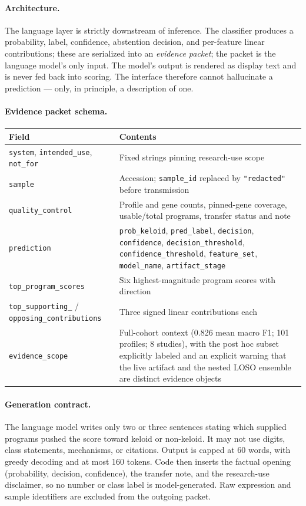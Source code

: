 \paragraph{Architecture.} The language layer is strictly downstream of
inference. The classifier produces a probability, label, confidence, abstention
decision, and per-feature linear contributions; these are serialized into an
\emph{evidence packet}; the packet is the language model's only input. The
model's output is rendered as display text and is never fed back into scoring.
The interface therefore cannot hallucinate a prediction --- only, in principle,
a description of one.

\paragraph{Evidence packet schema.}

{\small
\begin{tabular}{@{}lp{8.6cm}@{}}
\toprule
Field & Contents \\
\midrule
\texttt{system}, \texttt{intended\_use}, \texttt{not\_for} & Fixed strings pinning research-use scope \\
\texttt{sample} & Accession; \texttt{sample\_id} replaced by \texttt{"redacted"} before transmission \\
\texttt{quality\_control} & Profile and gene counts, pinned-gene coverage, usable/total programs, transfer status and note \\
\texttt{prediction} & \texttt{prob\_keloid}, \texttt{pred\_label}, \texttt{decision}, \texttt{confidence}, \texttt{decision\_threshold}, \texttt{confidence\_threshold}, \texttt{feature\_set}, \texttt{model\_name}, \texttt{artifact\_stage} \\
\texttt{top\_program\_scores} & Six highest-magnitude program scores with direction \\
\texttt{top\_supporting\_} / \texttt{opposing\_contributions} & Three signed linear contributions each \\
\texttt{evidence\_scope} & Full-cohort context (0.826 mean macro F1; 101 profiles; 8 studies), with the post hoc subset explicitly labeled and an explicit warning that the live artifact and the nested LOSO ensemble are distinct evidence objects \\
\bottomrule
\end{tabular}
}

\paragraph{Generation contract.} The language model writes only two or three
sentences stating which supplied programs pushed the score toward keloid or
non-keloid. It may not use digits, class statements, mechanisms, or citations.
Output is capped at 60 words, with greedy decoding and at most 160 tokens. Code
then inserts the factual opening (probability, decision, confidence), the
transfer note, and the research-use disclaimer, so no number or class label is
model-generated. Raw expression and sample identifiers are excluded from the
outgoing packet.

